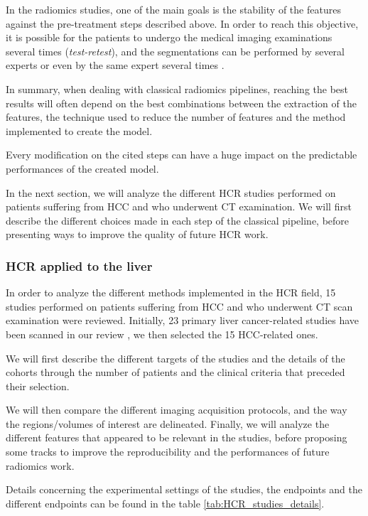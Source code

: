 \documentclass[]{article}
\begin{document}
In the radiomics studies, one of the main goals is the stability of the
features against the pre-treatment steps described above. In order to
reach this objective, it is possible for the patients to undergo the
medical imaging examinations several times (\emph{test-retest}), and the
segmentations can be performed by several experts or even by the same
expert several times \cite{Griethuysen2017}.

In summary, when dealing with classical radiomics pipelines, reaching
the best results will often depend on the best combinations between the
extraction of the features, the technique used to reduce the number of
features and the method implemented to create the model.

Every modification on the cited steps can have a huge impact on the
predictable performances of the created model.

In the next section, we will analyze the different HCR studies
performed on patients suffering from HCC and who underwent CT
examination. We will first describe the different choices made in each
step of the classical pipeline, before presenting ways to improve the
quality of future HCR work.

\subsubsection{HCR applied to the liver}\label{hcr-applied-to-the-liver}

In order to analyze the different methods implemented in the HCR
field, 15 studies performed on patients suffering from HCC and who
underwent CT scan examination were reviewed. Initially, 23 primary liver
cancer-related studies have been scanned in our review \cite{Wakabayashi2019}, we then selected the 15 HCC-related ones.

We will first describe the different targets of the studies and the
details of the cohorts through the number of patients and the clinical
criteria that preceded their selection.

We will then compare the different imaging acquisition protocols, and
the way the regions/volumes of interest are delineated. Finally, we will
analyze the different features that appeared to be relevant in the
studies, before proposing some tracks to improve the reproducibility and
the performances of future radiomics work.

Details concerning the experimental settings of the studies, the
endpoints and the different endpoints can be found in the table \ref{tab:HCR_studies_details}.
\end{document}
